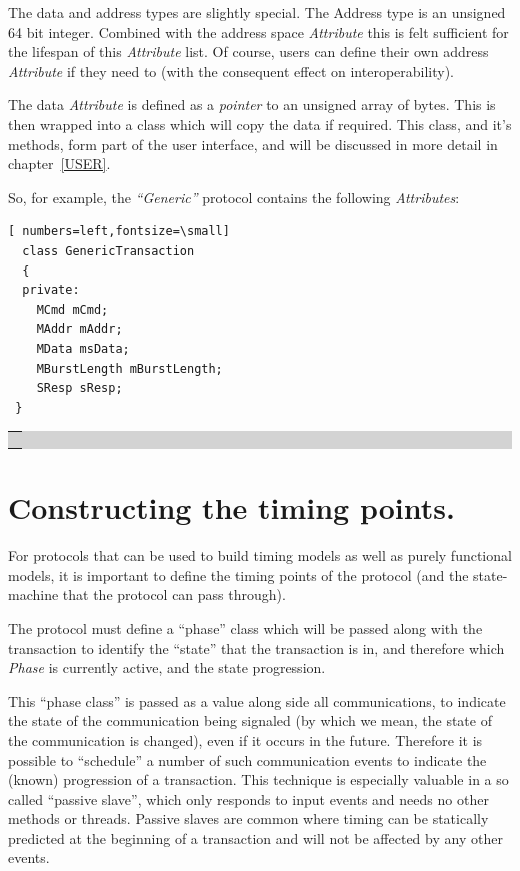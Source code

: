 \documentclass[12pt,oneside]{gsbook}
\newcommand{\atom}{{\em Phase}\xspace}
\newcommand{\quark}{{\em Attribute}\xspace}
\newcommand{\quarks}{{\em Attributes}\xspace}
\def\example#1{\begin{center}\colorbox{lightgrey}{\begin{tabular}{|p{0.6\paperwidth}|}\hline\\#1\\ \\ \hline\end{tabular}}\end{center}}
\newenvironment{exampleenv}{\begin{lrbox}{\examplebox}\begin{minipage}{0.6\paperwidth}}{\end{minipage}\end{lrbox}\example{\usebox{\examplebox}}}
\begin{document}
The data and address types are slightly special.
The Address type is an unsigned 64 bit integer. Combined with the address space
\quark this is felt sufficient for the lifespan of this \quark list. Of course,
users can define their own address \quark if they need to (with the consequent
effect on interoperability). 

The data \quark is defined as a {\em pointer} to an unsigned array of bytes. This
is then wrapped into a class which will copy the data if required.
This class, and it's methods, form part of the user interface, and
will be discussed in more detail in chapter~\ref{USER}. 

So, for example, the {\em ``Generic''} protocol contains the following
\quarks :
\begin{exampleenv}
\begin{Verbatim}[ numbers=left,fontsize=\small]
  class GenericTransaction
  {
  private:
    MCmd mCmd;
    MAddr mAddr;
    MData msData;
    MBurstLength mBurstLength;
    SResp sResp;
 }
\end{Verbatim}
\end{exampleenv}

\section{ Constructing the timing points. }

For protocols that can be used to build timing models as well as purely
functional models, it is important to define the timing points of the protocol
(and the state-machine that the protocol can pass through).

The protocol must define a ``phase'' class which will be passed along with the
transaction to identify the ``state'' that the transaction is in, and therefore
which \atom is currently active, and the state progression.

This ``phase class'' is passed as a value along side all
communications, to indicate the state of the communication being
signaled (by which we mean, the state of the communication is changed), even if it occurs in the future. Therefore it is possible
to ``schedule'' a number of such communication events to indicate the
(known) progression of a transaction.
This technique is especially valuable in a so called ``passive
slave'', which only responds to input events and needs no other
methods or threads. Passive slaves are common where timing can be
statically predicted at the beginning of a transaction and will not be
affected by any other events.
\end{document}
